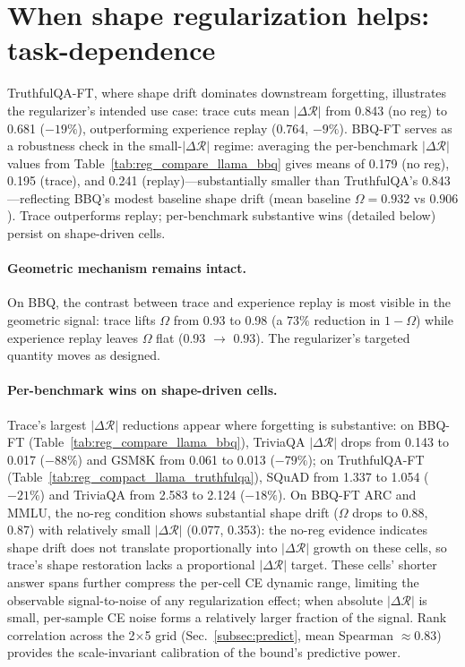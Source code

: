 \section{When shape regularization helps: task-dependence}
\label{app:reg_task_dependence}

TruthfulQA-FT, where shape drift dominates downstream forgetting, illustrates the regularizer's intended use case: trace cuts mean $|\Delta\mathcal{R}|$ from 0.843 (no reg) to 0.681 ($-19\%$), outperforming experience replay (0.764, $-9\%$). BBQ-FT serves as a robustness check in the small-$|\Delta\mathcal{R}|$ regime: averaging the per-benchmark $|\Delta\mathcal{R}|$ values from Table~\ref{tab:reg_compare_llama_bbq} gives means of 0.179 (no reg), 0.195 (trace), and 0.241 (replay)---substantially smaller than TruthfulQA's 0.843---reflecting BBQ's modest baseline shape drift (mean baseline $\Omega = 0.932$ vs $0.906$). Trace outperforms replay; per-benchmark substantive wins (detailed below) persist on shape-driven cells.

\paragraph{Geometric mechanism remains intact.}
On BBQ, the contrast between trace and experience replay is most visible in the geometric signal: trace lifts $\Omega$ from 0.93 to 0.98 (a $73\%$ reduction in $1-\Omega$) while experience replay leaves $\Omega$ flat (0.93 $\to$ 0.93). The regularizer's targeted quantity moves as designed.

\paragraph{Per-benchmark wins on shape-driven cells.}
Trace's largest $|\Delta\mathcal{R}|$ reductions appear where forgetting is substantive: on BBQ-FT (Table~\ref{tab:reg_compare_llama_bbq}), TriviaQA $|\Delta\mathcal{R}|$ drops from 0.143 to 0.017 ($-88\%$) and GSM8K from 0.061 to 0.013 ($-79\%$); on TruthfulQA-FT (Table~\ref{tab:reg_compact_llama_truthfulqa}), SQuAD from 1.337 to 1.054 ($-21\%$) and TriviaQA from 2.583 to 2.124 ($-18\%$). On BBQ-FT ARC and MMLU, the no-reg condition shows substantial shape drift ($\Omega$ drops to 0.88, 0.87) with relatively small $|\Delta\mathcal{R}|$ (0.077, 0.353): the no-reg evidence indicates shape drift does not translate proportionally into $|\Delta\mathcal{R}|$ growth on these cells, so trace's shape restoration lacks a proportional $|\Delta\mathcal{R}|$ target. These cells' shorter answer spans further compress the per-cell CE dynamic range, limiting the observable signal-to-noise of any regularization effect; when absolute $|\Delta\mathcal{R}|$ is small, per-sample CE noise forms a relatively larger fraction of the signal. Rank correlation across the 2$\times$5 grid (Sec.~\ref{subsec:predict}, mean Spearman $\approx 0.83$) provides the scale-invariant calibration of the bound's predictive power.

